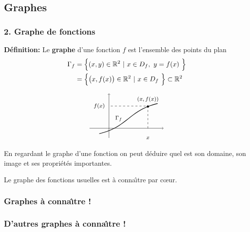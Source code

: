 \subsection{Graphes} 

\begin{frame}[plain]
\frametitle{\bf 2. Graphe de fonctions} 
\medskip 

{\bf D\'efinition:} 
Le {\bf graphe} d'une fonction $f$ est l'ensemble des points du plan
\begin{align*}
\Gamma_f & = \Big\{ (x,y)\in \mathbb R^2\ |\ x\in D_f,\ y=f(x)\ \Big\} \\ 
& = \Big\{ \big(x,f(x)\big)\in \mathbb R^2\ |\ x\in D_f\ \Big\}
\subset \mathbb R^2
\end{align*}

$$
\grapheF
$$

\pause
En regardant le graphe d'une fonction on peut d\'eduire quel est son domaine, 
son image et ses propri\'et\'es importantes. 
\vspace*{3mm}

\pause
Le graphe des fonctions usuelles est \`a conna\^{\i}tre par c{\oe}ur.  

\end{frame}


\begin{frame}
\frametitle{\bf Graphes \`a conna\^{\i}tre !} 
\medskip 

\grapheX \quad \grapheXX \quad \grapheXXX %

\grapheXinv \quad \grapheXXinv \quad \grapheXXXinv %

\grapheXsqrtII \quad \grapheXsqrtIII \quad \grapheXsqrtIV %

\end{frame}


\begin{frame}[plain]
\frametitle{\bf D'autres graphes \`a conna\^{\i}tre !} 
\medskip 

\grapheXVA \quad \grapheXXXVA \quad \grapheXinvVA \quad %

\grapheSIN \quad \grapheCOS \quad \grapheTAN %

\grapheASIN \quad \grapheACOS \quad \grapheATAN %

\end{frame}

